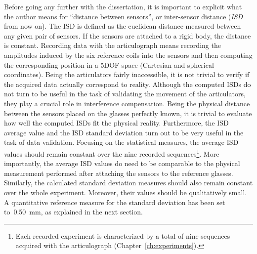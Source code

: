 Before going any further with the dissertation, it is important to explicit what
the author means for ``distance between sensors'', or inter-sensor distance 
(\emph{ISD} from now on).
The ISD is defined as the euclidean distance measured between any given pair 
of sensors.
If the sensors are attached to a rigid body, the distance is constant. 
Recording data with the articulograph means recording the amplitudes induced
by the six reference coils into the sensors and then computing the corresponding
position in a 5DOF space (Cartesian and spherical coordinates).
Being the articulators fairly inaccessible, it is not trivial to verify if the
acquired data actually correspond to reality.
Although the computed ISDs do not turn to be useful in the task of validating
the movement of the articulators, they play a crucial role in 
interference compensation.
Being the physical distance between the sensors placed on the glasses perfectly
known, it is trivial to evaluate how well the computed ISDs fit the physical
reality.
Furthermore, the ISD average value and the ISD standard deviation 
turn out to be very useful in the task of data validation.
Focusing on the statistical measures, the average ISD values should remain
constant over the nine recorded sequences\footnote{Each recorded experiment is
characterized by a total of nine sequences acquired with the articulograph 
(Chapter~\ref{ch:experiments}).}.
More importantly, the average ISD values do need to be comparable to the
physical measurement performed after attaching the sensors to the reference
glasses.
Similarly, the calculated standard deviation measures should also remain
constant over the whole experiment.
Moreover, their values should be qualitatively small.
A quantitative reference measure for the standard deviation has been set
to~0.50~mm, as explained in the next section.


